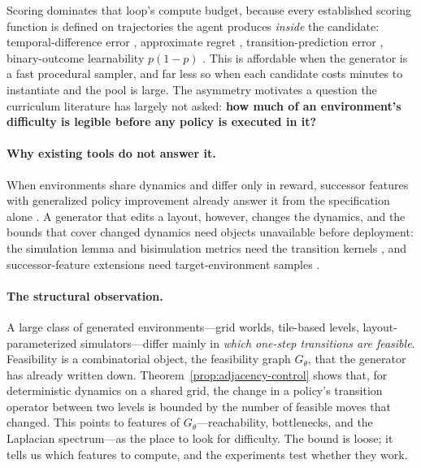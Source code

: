 \documentclass[twoside]{article}
\begin{document}
Scoring dominates that loop's compute budget, because every established scoring function is defined on trajectories the agent produces \emph{inside} the candidate: temporal-difference error \citep{jiang2021prioritized}, approximate regret \citep{dennis2020emergent, parker2022evolving}, transition-prediction error \citep{cho2025traced}, binary-outcome learnability $p(1-p)$ \citep{tzannetos2023proximal, rutherford2024no}. This is affordable when the generator is a fast procedural sampler, and far less so when each candidate costs minutes to instantiate and the pool is large. The asymmetry motivates a question the curriculum literature has largely not asked: \textbf{how much of an environment's difficulty is legible before any policy is executed in it?}

\paragraph{Why existing tools do not answer it.} When environments share dynamics and differ only in reward, successor features with generalized policy improvement already answer it from the specification alone \citep{barreto2017successor, barreto2018transfer}. A generator that edits a layout, however, changes the dynamics, and the bounds that cover changed dynamics need objects unavailable before deployment: the simulation lemma and bisimulation metrics need the transition kernels \citep{kearns2002near, ferns2004metrics}, and successor-feature extensions need target-environment samples \citep{abdolshah2021new, malekzadeh2023uncertainty}.

\paragraph{The structural observation.} A large class of generated environments---grid worlds, tile-based levels, layout-parameterized simulators---differ mainly in \emph{which one-step transitions are feasible}. Feasibility is a combinatorial object, the feasibility graph $G_\theta$, that the generator has already written down. Theorem~\ref{prop:adjacency-control} shows that, for deterministic dynamics on a shared grid, the change in a policy's transition operator between two levels is bounded by the number of feasible moves that changed. This points to features of $G_\theta$---reachability, bottlenecks, and the Laplacian spectrum---as the place to look for difficulty. The bound is loose; it tells us which features to compute, and the experiments test whether they work.
\end{document}
